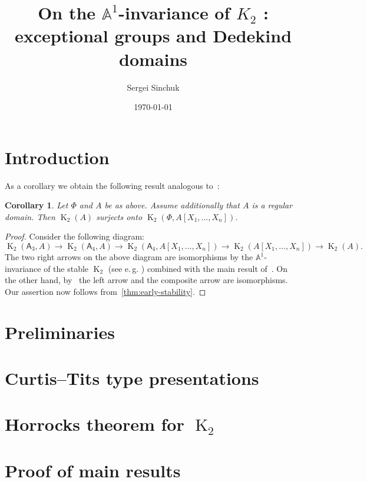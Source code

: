 \documentclass[oneside, 10pt]{amsart}
\title{On the $\mathbb{A}^1$-invariance of $K_2$ \RNum{2}: exceptional groups and Dedekind domains}
\author {Sergei Sinchuk}
\date {\today}
\DeclareMathOperator{\K}{K}
\newcommand{\rA}{\mathsf{A}}
\numberwithin{equation}{section}
\numberwithin{lemma}{section}
\newtheorem{cor}[lemma]{Corollary}
\theoremstyle{definition}
\theoremstyle{remark}
\begin{document}
    \maketitle

    \section{Introduction}\label{sec:introduction}

    As a corollary we obtain the following result analogous to~\cite[Theorem~1.1]{St-Ded}:
    \begin{cor}
        \label{cor:dedekind}
        Let $\Phi$ and $A$ be as above.
        Assume additionally that $A$ is a regular domain.
        Then $\K_2(A)$ surjects onto $\K_2(\Phi, A[X_1,\ldots, X_n])$.
    \end{cor}
    \begin{proof}
        Consider the following diagram:
        \[ \K_2(\rA_3, A) \to \K_2(\rA_4, A) \to \K_2(\rA_4, A[X_1, \ldots, X_n]) \rightarrow \K_2(A[X_1, \ldots, X_n]) \to \K_2(A).\]
        The two right arrows on the above diagram are isomorphisms by the $\mathbb{A}^1$-invariance of the stable $\K_2$
        (see e.\,g. \cite[Theorem~V.6.3]{Kbook}) combined with the main result of~\cite{Tu83}.
        On the other hand, by~\cite[Corollary~3.2]{ST76} the left arrow and the composite arrow are isomorphisms.
        Our assertion now follows from~\cref{thm:early-stability}.
    \end{proof}


    \section{Preliminaries}\label{sec:preliminaries}
    

    \section{Curtis--Tits type presentations} \label{sec:affine}
    

    \section{Horrocks theorem for $\K_2$} \label{sec:horrocks}
    

    \section{Proof of main results} \label{sec:main}
    

    \printbibliography
\end{document}
